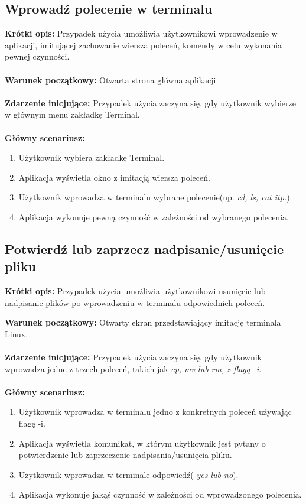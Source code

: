 \documentclass[10pt,a4paper]{report}
\begin{document}
\begin{adjustwidth}{2cm}{2cm}
\subsection{Wprowadź polecenie w terminalu}
\begin{minipage}{1\linewidth}
\textbf{Krótki opis:} Przypadek użycia umożliwia użytkownikowi wprowadzenie w aplikacji, imitującej zachowanie wiersza poleceń, komendy w celu wykonania pewnej czynności. \\ \\
\textbf{Warunek początkowy:} Otwarta strona główna aplikacji. \\ \\
\textbf{Zdarzenie inicjujące:} Przypadek użycia zaczyna się, gdy użytkownik wybierze w głównym menu zakładkę Terminal. \\ \\
\textbf{Główny scenariusz:} 
\begin{enumerate}
\setlength\itemsep{0.2cm}
    \item Użytkownik wybiera zakładkę Terminal.
    \item Aplikacja wyświetla okno z imitacją wiersza poleceń.
    \item Użytkownik wprowadza w terminalu wybrane polecenie(np. \textit{cd, ls, cat itp.}).
    \item Aplikacja wykonuje pewną czynność w zależności od wybranego polecenia.
\end{enumerate}
\end{minipage}
\subsection{Potwierdź lub zaprzecz nadpisanie/usunięcie pliku}
\begin{minipage}{1\linewidth}
\textbf{Krótki opis:} Przypadek użycia umożliwia użytkownikowi usunięcie lub nadpisanie plików po wprowadzeniu w terminalu odpowiednich poleceń.
\end{minipage}
\begin{minipage}{1\linewidth}
\textbf{Warunek początkowy:} Otwarty ekran przedstawiający imitację terminala Linux. \\ \\
\textbf{Zdarzenie inicjujące:} Przypadek użycia zaczyna się, gdy  użytkownik wprowadza jedne z trzech poleceń, takich jak \textit{cp, mv lub rm, z flagą -i}. \\ \\
\textbf{Główny scenariusz:} 
\begin{enumerate}
\setlength\itemsep{0.2cm}
    \item Użytkownik wprowadza w terminalu jedno z konkretnych poleceń używając flagę -i.
    \item Aplikacja wyświetla komunikat, w którym użytkownik jest pytany o potwierdzenie lub zaprzeczenie nadpisania/usunięcia pliku.
    \item Użytkownik wprowadza w terminale odpowiedź( \textit{yes lub no}).
    \item Aplikacja wykonuje jakąś czynność w zależności od wprowadzonego polecenia.
\end{enumerate}
\end{minipage}

\end{adjustwidth}
\end{document}
